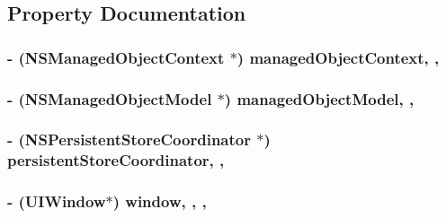 \subsection{Property Documentation}
\hypertarget{interface_app_delegate_a1fa650ded1ca9bb0eecda69d1f41cc1f}{
\subsubsection[{managed\-Object\-Context}]{\setlength{\rightskip}{0pt plus 5cm}-\/ (N\-S\-Managed\-Object\-Context $\ast$) managed\-Object\-Context\hspace{0.3cm}{\ttfamily [read]}, {\ttfamily [nonatomic]}, {\ttfamily [retain]}}}\label{interface_app_delegate_a1fa650ded1ca9bb0eecda69d1f41cc1f}
\hypertarget{interface_app_delegate_a9f3cb4e87e96ee48a07e2b72cf3f6d13}{
\subsubsection[{managed\-Object\-Model}]{\setlength{\rightskip}{0pt plus 5cm}-\/ (N\-S\-Managed\-Object\-Model $\ast$) managed\-Object\-Model\hspace{0.3cm}{\ttfamily [read]}, {\ttfamily [nonatomic]}, {\ttfamily [retain]}}}\label{interface_app_delegate_a9f3cb4e87e96ee48a07e2b72cf3f6d13}
\hypertarget{interface_app_delegate_a4169fdb1085cc13479280e10d44c039a}{
\subsubsection[{persistent\-Store\-Coordinator}]{\setlength{\rightskip}{0pt plus 5cm}-\/ (N\-S\-Persistent\-Store\-Coordinator $\ast$) persistent\-Store\-Coordinator\hspace{0.3cm}{\ttfamily [read]}, {\ttfamily [nonatomic]}, {\ttfamily [retain]}}}\label{interface_app_delegate_a4169fdb1085cc13479280e10d44c039a}
\hypertarget{interface_app_delegate_acf48ac24125e688cac1a85445cd7fac2}{
\subsubsection[{window}]{\setlength{\rightskip}{0pt plus 5cm}-\/ (U\-I\-Window$\ast$) window\hspace{0.3cm}{\ttfamily [read]}, {\ttfamily [write]}, {\ttfamily [nonatomic]}, {\ttfamily [strong]}}}\label{interface_app_delegate_acf48ac24125e688cac1a85445cd7fac2}


